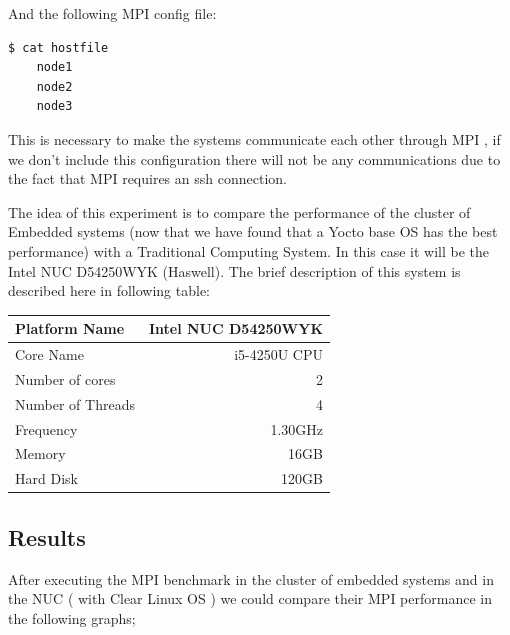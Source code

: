 And the following MPI config file:


\begin{minipage}{\textwidth}
\end{minipage}

\begin{minipage}{\textwidth}
\begin{lstlisting}[frame=single]
  $ cat hostfile
    node1
    node2
    node3
\end{lstlisting}

\end{minipage}

This is necessary to make the systems communicate each other through MPI , if we
don't include this configuration there will not be any communications due to the
fact that MPI requires an ssh connection. 

The idea of this experiment is to compare the performance of the cluster of
Embedded systems (now that we have found that a Yocto base OS has the best
performance) with a Traditional Computing System. In this case it will be the
Intel NUC D54250WYK (Haswell). The brief description of this system is
described here in following table: 

    \begin{center}
    \begin{tabular}{ | l | r |}
        \hline
        Platform Name & Intel NUC D54250WYK \\ \hline
        Core Name & i5-4250U CPU  \\ \hline
        Number of cores & 2 \\ \hline
        Number of Threads & 4 \\ \hline
        Frequency & 1.30GHz \\ \hline
        Memory & 16GB\\ \hline
        Hard Disk & 120GB \\ \hline
    \end{tabular}
    \end{center}



\subsection{Results}

After executing the MPI benchmark in the cluster of embedded systems  and in
the NUC ( with Clear Linux OS ) we could compare their MPI performance in the
following graphs; 


